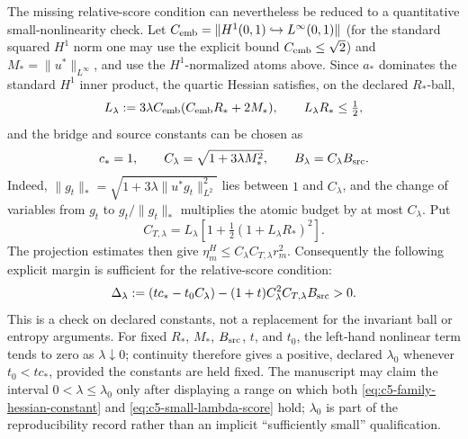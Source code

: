\documentclass[11pt]{article}
\theoremstyle{remark}
\begin{document}
The missing relative-score condition can nevertheless be reduced to a
quantitative small-nonlinearity check.  Let
$C_{\rm emb}=\|H^1(0,1)\hookrightarrow L^\infty(0,1)\|$ (for the
standard squared $H^1$ norm one may use the explicit bound
$C_{\rm emb}\leq\sqrt2$) and
$M_* = \|u^*\|_{L^\infty}$, and use the $H^1$-normalized atoms above.
Since $a_*$ dominates the standard $H^1$ inner product, the quartic
Hessian satisfies, on the declared $R_*$-ball,
\begin{equation}
 L_\lambda:=3\lambda C_{\rm emb}
       (C_{\rm emb}R_*+2M_*),\qquad L_\lambda R_*\leq\tfrac12,
 \label{eq:c5-family-hessian-constant}
\end{equation}
and the bridge and source constants can be chosen as
\begin{equation}
 c_*=1,\qquad C_\lambda=\sqrt{1+3\lambda M_*^2},\qquad
 B_\lambda=C_\lambda B_{\rm src}.
 \label{eq:c5-family-bridge-constants}
\end{equation}
Indeed, $\|g_t\|_*=\sqrt{1+3\lambda\|u^*g_t\|_{L^2}^2}$ lies
between $1$ and $C_\lambda$, and the change of variables from $g_t$ to
$g_t/\|g_t\|_*$ multiplies the atomic budget by at most $C_\lambda$.
Put
\begin{equation}
 C_{T,\lambda}=L_\lambda\left[1+\tfrac12(1+L_\lambda R_*)^2\right].
 \label{eq:c5-family-transfer-constant}
\end{equation}
The projection estimates then give
$\eta_m^H\leq C_\lambda C_{T,\lambda}r_m^2$.  Consequently the
following explicit margin is sufficient for the relative-score condition:
\begin{equation}
 \Delta_\lambda:=(tc_*-t_0C_\lambda)
 -(1+t)C_\lambda^2C_{T,\lambda}B_{\rm src}>0.
 \label{eq:c5-small-lambda-score}
\end{equation}
This is a check on declared constants, not a replacement for the invariant
ball or entropy arguments.  For fixed $R_*$, $M_*$, $B_{\rm src}$, $t$, and
$t_0$, the left-hand nonlinear term tends to zero as $\lambda\downarrow0$;
continuity therefore gives a positive, declared $\lambda_0$ whenever
$t_0<tc_*$, provided the constants are held fixed.  The manuscript may
claim the interval $0<\lambda\leq\lambda_0$ only after displaying a range
on which both \eqref{eq:c5-family-hessian-constant} and
\eqref{eq:c5-small-lambda-score} hold; $\lambda_0$ is part of the
reproducibility record rather than an implicit ``sufficiently small''
qualification.
\end{document}
